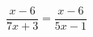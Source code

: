 \begin{ex}[type=equation]
	\begin{condition}
		\( \dfrac{x-6}{7x+3}=\dfrac{x-6}{5x-1} \)
	\end{condition}
\end{ex}